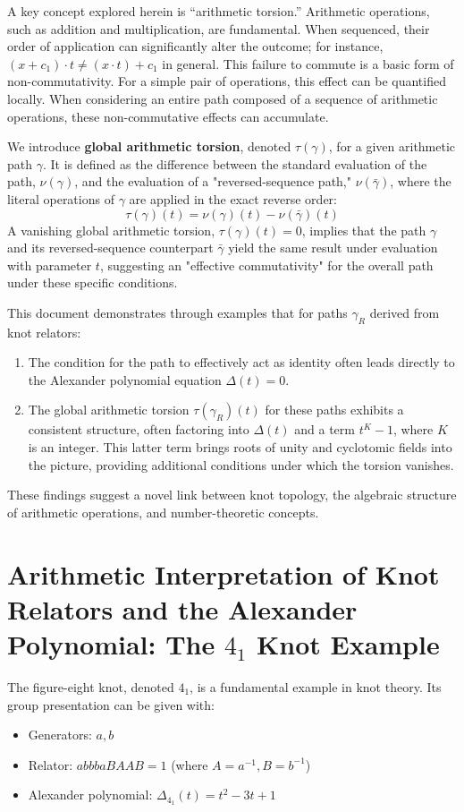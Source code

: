 \documentclass{article}[a4paper,12pt]
\begin{document}
A key concept explored herein is ``arithmetic torsion.'' Arithmetic operations, such as addition and multiplication, are fundamental. When sequenced, their order of application can significantly alter the outcome; for instance, $(x+c_1) \cdot t \neq (x \cdot t) + c_1$ in general. This failure to commute is a basic form of non-commutativity. For a simple pair of operations, this effect can be quantified locally. When considering an entire path composed of a sequence of arithmetic operations, these non-commutative effects can accumulate.

We introduce \textbf{global arithmetic torsion}, denoted $\tau(\gamma)$, for a given arithmetic path $\gamma$. It is defined as the difference between the standard evaluation of the path, $\nu(\gamma)$, and the evaluation of a "reversed-sequence path," $\nu(\bar{\gamma})$, where the literal operations of $\gamma$ are applied in the exact reverse order:
\[ \tau(\gamma)(t) = \nu(\gamma)(t) - \nu(\bar{\gamma})(t) \]
A vanishing global arithmetic torsion, $\tau(\gamma)(t)=0$, implies that the path $\gamma$ and its reversed-sequence counterpart $\bar{\gamma}$ yield the same result under evaluation with parameter $t$, suggesting an "effective commutativity" for the overall path under these specific conditions.

This document demonstrates through examples that for paths $\gamma_R$ derived from knot relators:
\begin{enumerate}
    \item The condition for the path to effectively act as identity often leads directly to the Alexander polynomial equation $\Delta(t)=0$.
    \item The global arithmetic torsion $\tau(\gamma_R)(t)$ for these paths exhibits a consistent structure, often factoring into $\Delta(t)$ and a term $t^K-1$, where $K$ is an integer. This latter term brings roots of unity and cyclotomic fields into the picture, providing additional conditions under which the torsion vanishes.
\end{enumerate}
These findings suggest a novel link between knot topology, the algebraic structure of arithmetic operations, and number-theoretic concepts.

\section{Arithmetic Interpretation of Knot Relators and the Alexander Polynomial: The $4_1$ Knot Example}

The figure-eight knot, denoted $4_1$, is a fundamental example in knot theory. Its group presentation can be given with:
\begin{itemize}
    \item Generators: $a, b$
    \item Relator: $abbbaBAAB = 1$ (where $A=a^{-1}, B=b^{-1}$)
    \item Alexander polynomial: $\Delta_{4_1}(t) = t^2 - 3t + 1$
\end{itemize}
\end{document}
